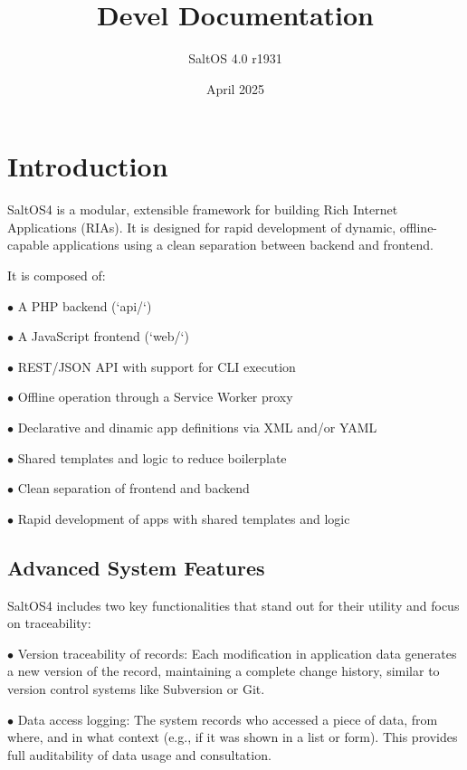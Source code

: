 \documentclass[a4paper]{article}
\title{Devel Documentation}
\author{SaltOS 4.0 r1931}
\begin{document}
\date{April 2025}
\maketitle
\clearpage

\tableofcontents
\clearpage


\hypertarget{toc1}{}
\section{Introduction}

SaltOS4 is a modular, extensible framework for building Rich Internet Applications (RIAs). It is designed for rapid development of dynamic, offline-capable applications using a clean separation between backend and frontend.

It is composed of:

\begin{compactitem}
\item[\color{myblue}$\bullet$] A PHP backend (`api/`)
\item[\color{myblue}$\bullet$] A JavaScript frontend (`web/`)
\item[\color{myblue}$\bullet$] REST/JSON API with support for CLI execution
\item[\color{myblue}$\bullet$] Offline operation through a Service Worker proxy
\item[\color{myblue}$\bullet$] Declarative and dinamic app definitions via XML and/or YAML
\item[\color{myblue}$\bullet$] Shared templates and logic to reduce boilerplate
\item[\color{myblue}$\bullet$] Clean separation of frontend and backend
\item[\color{myblue}$\bullet$] Rapid development of apps with shared templates and logic
\end{compactitem}

\hypertarget{toc2}{}
\subsection{Advanced System Features}

SaltOS4 includes two key functionalities that stand out for their utility and focus on traceability:

\begin{compactitem}
\item[\color{myblue}$\bullet$] Version traceability of records: Each modification in application data generates a new version of the record, maintaining a complete change history, similar to version control systems like Subversion or Git.
\item[\color{myblue}$\bullet$] Data access logging: The system records who accessed a piece of data, from where, and in what context (e.g., if it was shown in a list or form). This provides full auditability of data usage and consultation.
\end{compactitem}
\end{document}
